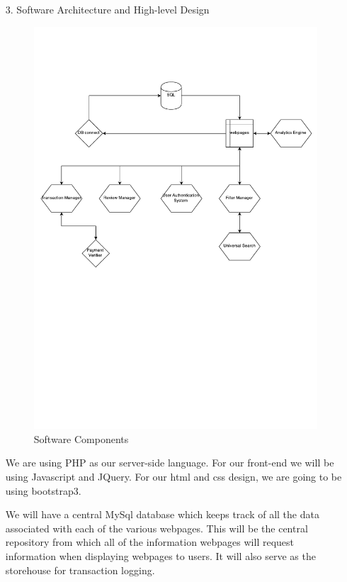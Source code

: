 \documentclass[12pt]{article}
\begin{document}
\begin{enumerate}
\item[3.] Software Architecture and High-level Design
\begin{figure}[ht!]
\centering
\includegraphics[width=150mm]{swag.pdf}
\caption{Software Components \label{overflow}}
\end{figure}

We are using PHP as our server-side language. For our front-end we will be using Javascript and JQuery. For our html and css design, we are going to be using bootstrap3.

We will have a central MySql database which keeps track of all the data associated with each of the various webpages. This will be the central repository from which all of the information webpages will request information when displaying webpages to users. It will also serve as the storehouse for transaction logging.


\end{enumerate}
\end{document}
